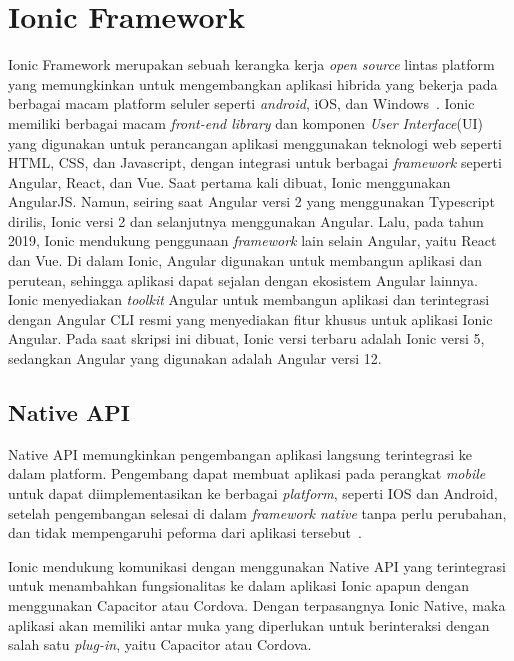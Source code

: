 \section{Ionic Framework}
\label{sec:ionicframework} 
 
Ionic Framework merupakan sebuah kerangka kerja {\it open source} lintas platform yang memungkinkan untuk mengembangkan aplikasi hibrida yang bekerja pada berbagai macam platform seluler seperti {\it android}, iOS, dan Windows~\cite{waranashiwar:18:ionic}. Ionic memiliki berbagai macam \textit{front-end library} dan komponen \textit{User Interface}(UI) yang digunakan untuk  perancangan aplikasi menggunakan teknologi web seperti HTML, CSS, dan Javascript, dengan integrasi untuk berbagai \textit{framework} seperti Angular, React, dan Vue. Saat pertama kali dibuat, Ionic menggunakan AngularJS. Namun, seiring saat Angular versi 2 yang menggunakan Typescript dirilis, Ionic versi 2 dan selanjutnya menggunakan Angular. Lalu, pada tahun 2019, Ionic mendukung penggunaan \textit{framework} lain selain Angular, yaitu React dan Vue. Di dalam Ionic, Angular digunakan untuk membangun aplikasi dan perutean, sehingga aplikasi dapat sejalan dengan ekosistem Angular lainnya. Ionic menyediakan {\it toolkit} Angular untuk membangun aplikasi dan terintegrasi dengan Angular CLI resmi yang menyediakan fitur khusus untuk aplikasi Ionic Angular. Pada saat skripsi ini dibuat, Ionic versi terbaru adalah Ionic versi 5, sedangkan Angular yang digunakan adalah Angular versi 12. 

\subsection{Native API}
\label{subsec:nativeApi}
Native API memungkinkan pengembangan aplikasi langsung terintegrasi ke dalam platform. Pengembang dapat membuat aplikasi pada perangkat {\it mobile} untuk dapat diimplementasikan ke berbagai {\it platform}, seperti IOS dan Android, setelah pengembangan selesai di dalam {\it framework native} tanpa perlu perubahan, dan tidak mempengaruhi peforma dari aplikasi tersebut~\cite{griffith:17:mobile}. 

Ionic mendukung komunikasi dengan menggunakan Native API yang terintegrasi untuk menambahkan fungsionalitas ke dalam aplikasi Ionic apapun dengan menggunakan Capacitor atau Cordova. Dengan terpasangnya Ionic Native, maka aplikasi akan memiliki antar muka yang diperlukan untuk berinteraksi dengan salah satu {\it plug-in}, yaitu Capacitor atau Cordova.

